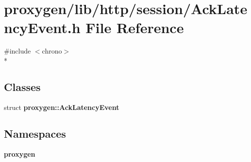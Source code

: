 \section{proxygen/lib/http/session/\+Ack\+Latency\+Event.h File Reference}
\label{AckLatencyEvent_8h}
{\ttfamily \#include $<$chrono$>$}\\*
\subsection*{Classes}
\begin{DoxyCompactItemize}
\item 
struct {\bf proxygen\+::\+Ack\+Latency\+Event}
\end{DoxyCompactItemize}
\subsection*{Namespaces}
\begin{DoxyCompactItemize}
\item 
 {\bf proxygen}
\end{DoxyCompactItemize}
